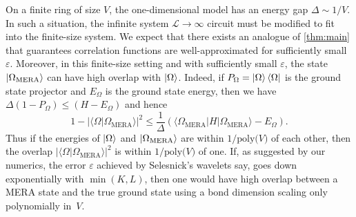 \documentclass[aps,pra,reprint,superscriptaddress,floatfix,amsmath,amssymb,amsfonts]{revtex4-1}
\begin{document}
On a finite ring of size $V$, the one-dimensional model has an energy gap $\Delta \sim 1/V$.
In such a situation, the infinite system $\mathcal{L} \rightarrow \infty$ circuit must be modified to fit into the finite-size system.
We expect that there exists an analogue of \cref{thm:main} that guarantees correlation functions are well-approximated for sufficiently small $\varepsilon$.
Moreover, in this finite-size setting and with sufficiently small $\varepsilon$, the state $\ket{\Omega_{\text{MERA}}}$ can have high overlap with $\ket{\Omega}$. Indeed, if $P_\Omega = \ket{\Omega} \bra{\Omega}$ is the ground state projector and $E_\Omega$ is the ground state energy, then we have $ \Delta (1-P_\Omega) \leq (H - E_\Omega )$ and hence
\begin{equation*}
1 - |\langle \Omega | \Omega_{\text{MERA}} \rangle|^2 \leq \frac{1}{\Delta} (\langle \Omega_{\text{MERA}} | H | \Omega_{\text{MERA}} \rangle - E_\Omega ).
\end{equation*}
Thus if the energies of $\ket{\Omega}$ and $\ket{\Omega_{\text{MERA}}}$ are within $1/\text{poly($V$)}$ of each other, then the overlap $|\langle \Omega | \Omega_{\text{MERA}} \rangle|^2$ is within $1/\text{poly($V$)}$ of one. If, as suggested by our numerics, the error $\varepsilon$ achieved by Selesnick's wavelets say, goes down exponentially with $\min(K,L)$, then one would have high overlap between a MERA state and the true ground state using a bond dimension scaling only polynomially in~$V$.


\end{document}
